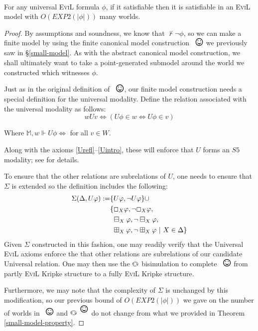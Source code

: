 \begin{theorem}\ \\
For any universal \textsc{EviL} formula $\phi$, if it satisfiable then
it is satisfiable in an \textsc{EviL} model with $O(EXP2(|\phi|))$
many worlds.
\end{theorem}
\begin{proof}
By assumptions and soundness, we know that $\nvdash \neg
\phi$, so we can make a finite model by using the finite canonical model construction
$\Cross$ we
previously saw in \S\ref{small-model}.  As with the abstract canonical
model construction, we shall ultimately want to take a point-generated
submodel around the world we constructed which witnesses $\phi$.

Just as in the original definition of $\Cross$, our finite model
construction needs a special definition for the universal modality.
Define the relation associated with the universal
modality as follows:
\[ w U v \iff (U \phi \in w \iff U \phi \in v)\]

Where $\mathbb{M}, w \Vdash U \phi \iff $ for all $v \in W$. 

Along with the axioms \ref{Urefl}--\ref{Uintro}, these will enforce
that $U$ forms an $S5$ modality; see 
\cite[chapter 5, pgs. 81--82]{boolos_logic_1995} for details.  

To ensure that the other relations are subrelations of $U$, 
one needs to ensure that $\Sigma$ is extended so the definition
includes the following:
\begin{align*}
\Sigma(\Delta,U \varphi) := &   \{ U \varphi, \neg U \varphi \} \cup \\
& \{ \Box_X \varphi,\neg \Box_X \varphi, \\
& \ \boxminus_X \varphi, \neg\boxminus_X \varphi, \\
& \ \boxplus_X \varphi, \neg\boxplus_X \varphi  \ |\ X \in \Delta
\}
\end{align*}
Given $\Sigma$ constructed in this fashion, one may readily verify
that the Universal \textsc{EviL} axioms enforce the that other
relations are subrelations of our candidate Universal relation.  One
may then use the $\invis$ bisimulation to complete $\Cross$ from
partly \textsc{EviL} Kripke structure to a fully \textsc{EviL} Kripke structure.

Furthermore, we may note that the complexity of $\Sigma$ is unchanged by
this modification, so our previous bound of $O(EXP2(|\phi|))$ we gave
on the number of worlds in $\Cross$ and $\invis^\Cross$ do not change from what we
provided in Theorem \ref{small-model-property}.
\end{proof}

